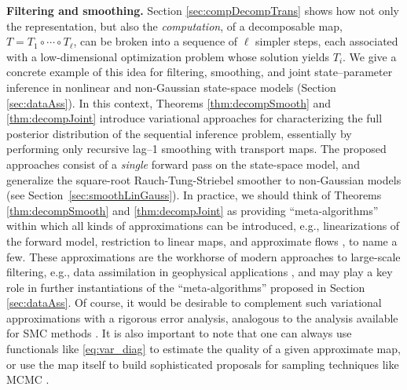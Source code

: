 \documentclass[twoside,11pt]{article}
\begin{document}
%
{\bf Filtering and smoothing.}
Section \ref{sec:compDecompTrans} shows how not only the
representation, but also the \textit{computation}, of a decomposable
map, $T=T_1 \circ \cdots \circ T_\ell$, can be broken into a
sequence of $\ell$ simpler steps, each associated with a
low-dimensional optimization problem whose solution yields $T_i$. 
%
%
%
%
%
%
%
%
%
%
%
%
%
%
We give a concrete example of this idea for %
filtering, smoothing, and joint state--parameter inference in
nonlinear and non-Gaussian
state-space models (Section \ref{sec:dataAss}).
%
In this context, 
Theorems \ref{thm:decompSmooth} and \ref{thm:decompJoint} introduce
variational
approaches for characterizing the full posterior distribution of %
%
the sequential inference problem, 
%
essentially by performing only 
recursive lag--1 smoothing with transport maps.
%
%
%
%
%
The proposed approaches consist of a {\it single} forward pass on the
state-space model, and generalize the square-root
Rauch-Tung-Striebel  smoother to non-Gaussian models  (see Section~\ref{sec:smoothLinGauss}).
%
%
%
%
%
%
%
In practice, we should think of Theorems \ref{thm:decompSmooth} and
\ref{thm:decompJoint} as providing ``meta-algorithms'' within which
all kinds of approximations can be introduced, e.g.,
%
%
%
%
linearizations of the forward model, 
restriction to 
linear maps, and approximate flows \citep{daum2008particle,liu2016stein}, 
to name a few. %
These approximations are the workhorse of
modern approaches to 
large-scale filtering, e.g., data assimilation in geophysical applications
\citep{sarkka2013bayesian,evensen2007data}, and may play a key role
in further instantiations of the ``meta-algorithms'' 
proposed in Section \ref{sec:dataAss}. 
Of course, it would be desirable
to complement such variational approximations with a rigorous 
error analysis, analogous to the analysis available for
%
SMC methods %
\citep{crisan2002survey,del2004feynman,smith2013sequential}. 
It is also important to note that one can always use functionals like
\eqref{eq:var_diag} 
to estimate the quality of a given approximate map, or use the map itself to build
sophisticated proposals for sampling techniques like MCMC \citep{parno2014transport}.
\end{document}
